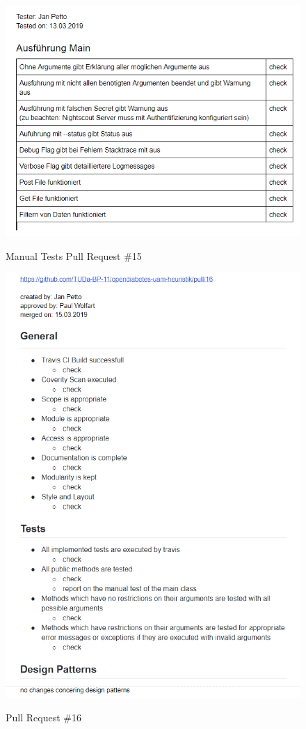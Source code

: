 \documentclass[accentcolor=tud0b,12pt,paper=a4]{tudreport}
\begin{document}
\begin{figure}[h]
\centering
\caption{Manual Tests Pull Request \#15}
\includegraphics[width=\textwidth,height=\textheight,keepaspectratio]{pr-tests-15}
\label{pr-tests:15}
\end{figure}

\begin{figure}[h]
\centering
\caption{Pull Request \#16}
\includegraphics[width=\textwidth,height=\textheight,keepaspectratio]{pr-16}
\label{pr:16}
\end{figure}
\end{document}
